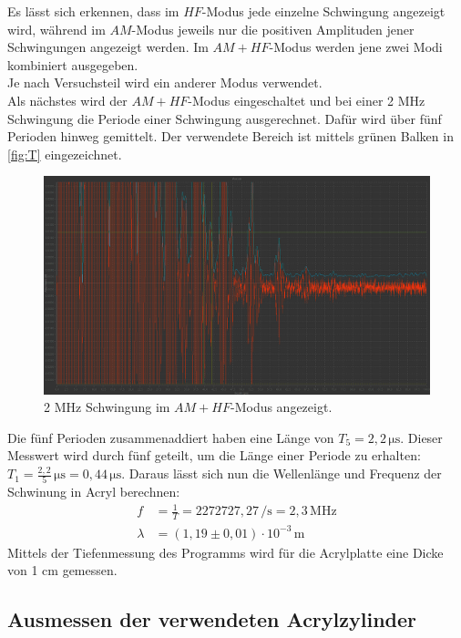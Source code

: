 Es lässt sich erkennen, dass im $HF$-Modus jede einzelne Schwingung angezeigt wird, während
im $AM$-Modus jeweils nur die positiven Amplituden jener Schwingungen angezeigt werden. Im $AM + HF$-Modus
werden jene zwei Modi kombiniert ausgegeben.\\
Je nach Versuchsteil wird ein anderer Modus verwendet.\\
Als nächstes wird der $AM + HF$-Modus eingeschaltet und bei einer 2 MHz Schwingung die Periode einer Schwingung
ausgerechnet. Dafür wird über fünf Perioden hinweg gemittelt. Der verwendete Bereich ist mittels grünen Balken 
in \autoref{fig:T} eingezeichnet.
\begin{figure}
  \centering
  \includegraphics[width=15cm]{messwerte/Vorbereitung/T.png}
  \caption{2 MHz Schwingung im $AM + HF$-Modus angezeigt.}
  \label{fig:T}
\end{figure}
Die fünf Perioden zusammenaddiert haben eine Länge von $T_5 =2,2 \, \si{\micro\second}$. Dieser Messwert wird
durch fünf geteilt, um die Länge einer Periode zu erhalten: $T_1 = \frac{2,2}{5} \, \si{\micro\second} = 0,44 \, \si{\micro\second}$.
Daraus lässt sich nun die Wellenlänge und Frequenz der Schwinung in Acryl berechnen:
\begin{align*}
  f &= \frac{1}{T} = 2 272 727,27 \, \si{\per\second} = 2,3 \, \mathrm{MHz}\\
  \lambda &= (1,19 \pm 0,01) \cdot 10^{-3} \, \si{\meter}
\end{align*}
Mittels der Tiefenmessung des Programms wird für die Acrylplatte eine Dicke von 1 cm gemessen.

\subsection{Ausmessen der verwendeten Acrylzylinder}

